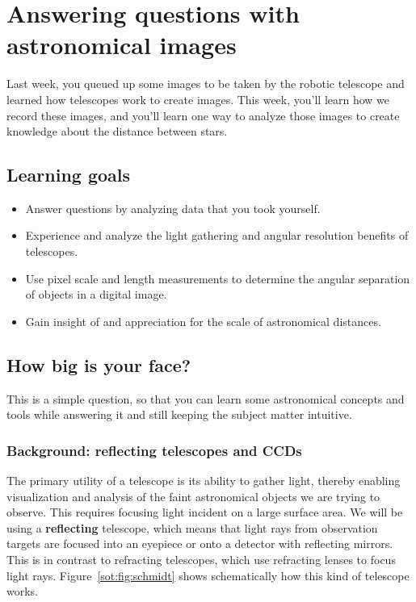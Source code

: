 \chapter{Answering questions with astronomical images}

Last week, you queued up some images to be taken by the robotic telescope and learned how telescopes work to create images. This week, you'll learn how we record these images, and you'll learn one way to analyze those images to create knowledge about the distance between stars.

\section{Learning goals}

\begin{itemize}
	\item Answer questions by analyzing data that you took yourself.
	
	\item Experience and analyze the light gathering and angular resolution benefits of telescopes.
	
	\item Use pixel scale and length measurements to determine the angular separation of objects in a digital image.
	
	\item Gain insight of and appreciation for the scale of astronomical distances.
\end{itemize}

\section{How big is your face?}

This is a simple question, so that you can learn some astronomical concepts and tools while answering it and still keeping the subject matter intuitive.

\subsection{Background: reflecting telescopes and CCDs}

The primary utility of a telescope is its ability to gather light, thereby enabling visualization and analysis of the faint astronomical objects we are trying to observe. This requires focusing light incident on a large surface area. We will be using a \textbf{reflecting} telescope, which means that light rays from observation targets are focused into an eyepiece or onto a detector with reflecting mirrors. This is in contrast to refracting telescopes, which use refracting lenses to focus light rays. Figure~\ref{sot:fig:schmidt} shows schematically how this kind of telescope works. 

